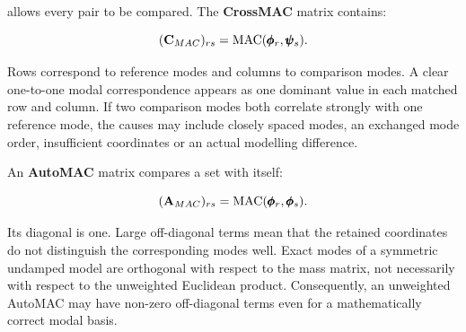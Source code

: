 allows every pair to be compared. The \textbf{CrossMAC} matrix contains:

\begin{equation}
    (\mathbf{C}_{MAC})_{rs}
    =\operatorname{MAC}(\pmb{\phi}_r,\pmb{\psi}_s).
\end{equation}

Rows correspond to reference modes and columns to comparison modes. A clear
one-to-one modal correspondence appears as one dominant value in each matched
row and column. If two comparison modes both correlate strongly with one
reference mode, the causes may include closely spaced modes, an exchanged mode
order, insufficient coordinates or an actual modelling difference.

An \textbf{AutoMAC} matrix compares a set with itself:

\begin{equation}
    (\mathbf{A}_{MAC})_{rs}
    =\operatorname{MAC}(\pmb{\phi}_r,\pmb{\phi}_s).
\end{equation}

Its diagonal is one. Large off-diagonal terms mean that the retained coordinates
do not distinguish the corresponding modes well. Exact modes of a symmetric
undamped model are orthogonal with respect to the mass matrix, not necessarily
with respect to the unweighted Euclidean product. Consequently, an unweighted
AutoMAC may have non-zero off-diagonal terms even for a mathematically correct
modal basis.

